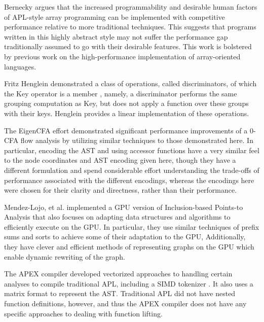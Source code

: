 ﻿\documentclass[numbers,10pt,preprint]{sigplanconf}
\begin{document}
Bernecky \cite{bernecky2015abstract} argues that the increased programmability and desirable human factors of APL-style array programming can be implemented with competitive performance relative to more traditional techniques. This suggests that programs written in this highly abstract style may not suffer the performance gap traditionally assumed to go with their desirable features. This work is bolstered by previous work on the high-performance implementation of array-oriented languages. \cite{ching1994experimental,ching1993primitive, ching1990automatic,ju1991exploitation, ju1991performance,bernecky1999reducing,schwarz1991acorn}

Fritz Henglein demonstrated a class of operations, called discriminators, of which the Key operator is a member \cite{henglein2013dd} , namely, a discriminator performs the same grouping computation as Key, but does not apply a function over these groups with their keys. Henglein provides a linear implementation of these operations.

The EigenCFA effort \cite{prabhu2011eigencfa} demonstrated significant performance improvements of a 0-CFA flow analysis by utilizing similar techniques to those demonstrated here. In particular, encoding the AST and using accessor functions have a very similar feel to the node coordinates and AST encoding given here, though they have a different formulation and spend considerable effort understanding the trade-offs of performance associated with the different encodings, whereas the encodings here were chosen for their clarity and directness, rather than their performance.

Mendez-Lojo, et al. implemented a GPU version of Inclusion-based Points-to Analysis \cite{mendez2012inclusion} that also focuses on adapting data structures and algorithms to efficiently execute on the GPU. In particular, they use similar techniques of prefix sums and sorts to achieve some of their adaptation to the GPU, Additionally, they have clever and efficient methods of representing graphs on the GPU which enable dynamic rewriting of the graph.

The APEX compiler \cite{bernecky1997apex} developed vectorized approaches to handling certain analyses to compile traditional APL, including a SIMD tokenizer \cite{bernecky2003tokenizer}. It also uses a matrix format to represent the AST. Traditional APL did not have nested function definitions, however, and thus the APEX compiler does not have any specific approaches to dealing with function lifting.
\end{document}
